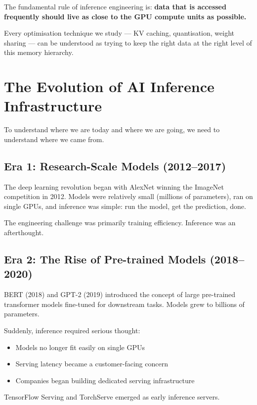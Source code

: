 \documentclass[12pt, twoside, openright]{book}
\begin{document}
The fundamental rule of inference engineering is:
\textbf{data that is accessed frequently should live as close to the
GPU compute units as possible.}

Every optimisation technique we study --- KV caching, quantisation,
weight sharing --- can be understood as trying to keep the right data
at the right level of this memory hierarchy.

\section{The Evolution of AI Inference Infrastructure}

To understand where we are today and where we are going, we need to
understand where we came from.

\subsection{Era 1: Research-Scale Models (2012--2017)}

The deep learning revolution began with AlexNet winning the ImageNet
competition in 2012. Models were relatively small (millions of parameters),
ran on single GPUs, and inference was simple: run the model, get the
prediction, done.

The engineering challenge was primarily training efficiency.
Inference was an afterthought.

\subsection{Era 2: The Rise of Pre-trained Models (2018--2020)}

BERT (2018) and GPT-2 (2019) introduced the concept of large pre-trained
transformer models fine-tuned for downstream tasks.
Models grew to billions of parameters.

Suddenly, inference required serious thought:
\begin{itemize}
  \item Models no longer fit easily on single GPUs
  \item Serving latency became a customer-facing concern
  \item Companies began building dedicated serving infrastructure
\end{itemize}

TensorFlow Serving and TorchServe emerged as early inference servers.
\end{document}
